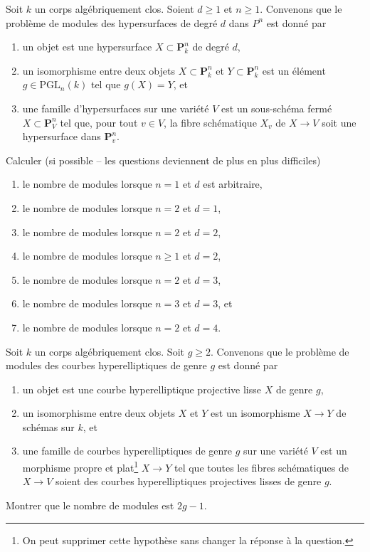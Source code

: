 \begin{exercise}
\label{exercise-number-moduli-lines-conics}
Soit $k$ un corps algébriquement clos. Soient $d \geq 1$ et $n \geq 1$.
Convenons que le problème de modules des hypersurfaces de degré $d$ dans $P^n$ est donné par
\begin{enumerate}
\item un objet est une hypersurface $X \subset \mathbf{P}^n_k$
de degré $d$,
\item un isomorphisme entre deux objets $X \subset \mathbf{P}^n_k$
et $Y \subset \mathbf{P}^n_k$ est un élément $g \in \text{PGL}_n(k)$
tel que $g(X) = Y$, et
\item une famille d'hypersurfaces sur une variété $V$ est un sous-schéma
fermé $X \subset \mathbf{P}^n_V$ tel que, pour tout $v \in V$,
la fibre schématique $X_v$ de $X \to V$ soit
une hypersurface dans $\mathbf{P}^n_v$.
\end{enumerate}
Calculer (si possible -- les questions deviennent de plus en plus difficiles)
\begin{enumerate}
\item le nombre de modules lorsque $n = 1$ et $d$ est arbitraire,
\item le nombre de modules lorsque $n = 2$ et $d = 1$,
\item le nombre de modules lorsque $n = 2$ et $d = 2$,
\item le nombre de modules lorsque $n \geq 1$ et $d = 2$,
\item le nombre de modules lorsque $n = 2$ et $d = 3$,
\item le nombre de modules lorsque $n = 3$ et $d = 3$, et
\item le nombre de modules lorsque $n = 2$ et $d = 4$.
\end{enumerate}
\end{exercise}

\begin{exercise}
\label{exercise-number-moduli-hyperelliptic}
Soit $k$ un corps algébriquement clos. Soit $g \geq 2$.
Convenons que le problème de modules des courbes hyperelliptiques de genre $g$ est donné par
\begin{enumerate}
\item un objet est une courbe hyperelliptique projective lisse $X$
de genre $g$,
\item un isomorphisme entre deux objets $X$ et $Y$ est un
isomorphisme $X \to Y$ de schémas sur $k$, et
\item une famille de courbes hyperelliptiques de genre $g$ sur une variété $V$ est un
morphisme propre et plat\footnote{On peut supprimer cette hypothèse sans changer
la réponse à la question.} $X \to Y$ tel que toutes les fibres
schématiques de $X \to V$ soient des courbes hyperelliptiques projectives lisses
de genre $g$.
\end{enumerate}
Montrer que le nombre de modules est $2g - 1$.
\end{exercise}





